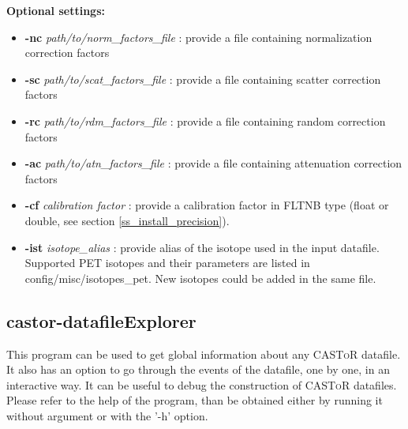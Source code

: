 \documentclass[a4paper, 11pt]{article}
\newcommand{\castor}{\textsc{CASToR}\xspace}
\begin{document}
\textbf{Optional settings:}
\begin{itemize}
  \item \textbf{-nc} \textit{path/to/norm\_factors\_file} : provide a file containing normalization correction factors
  \item \textbf{-sc} \textit{path/to/scat\_factors\_file} : provide a file containing scatter correction factors
  \item \textbf{-rc} \textit{path/to/rdm\_factors\_file}  : provide a file containing random correction factors
  \item \textbf{-ac} \textit{path/to/atn\_factors\_file}  : provide a file containing attenuation correction factors
  \item \textbf{-cf} \textit{calibration factor}          : provide a calibration factor in FLTNB type (float or double, see section
        \ref{ss_install_precision}).
  \item \textbf{-ist} \textit{isotope\_alias}             : provide alias of the isotope used in the input datafile. Supported PET
        isotopes and their parameters are listed in config/misc/isotopes\_pet. New isotopes could be added in the same file.
\end{itemize}

\subsection{castor-datafileExplorer}
\label{ss_utilities_dexplorer}

This program can be used to get global information about any \castor datafile. It also has an option to go through the events of the datafile, one by one, in an
interactive way. It can be useful to debug the construction of \castor datafiles. Please refer to the help of the program, than be obtained either by running it
without argument or with the '-h' option.


\end{document}
